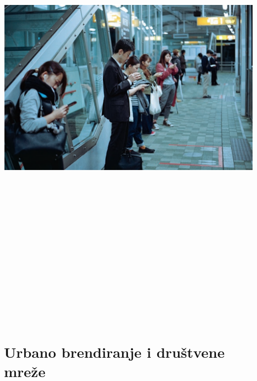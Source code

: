 \documentclass[a0,portrait]{a0poster}
\begin{document}
\begin{multicols}{2}
\begin{center}\vspace{2cm}
\includegraphics[width=35cm,height=25cm]{mreze.png}
\end{center}\vspace{12cm}

\section*{\Huge{Urbano brendiranje i društvene mreže}}


\end{multicols}
\end{document}
